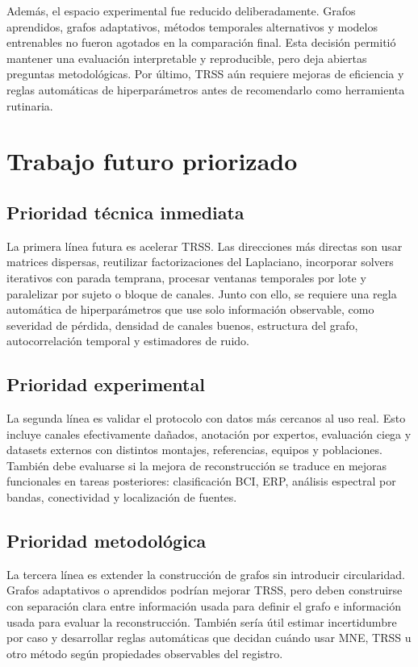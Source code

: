 Además, el espacio experimental fue reducido deliberadamente. Grafos aprendidos, grafos adaptativos, métodos temporales alternativos y modelos entrenables no fueron agotados en la comparación final. Esta decisión permitió mantener una evaluación interpretable y reproducible, pero deja abiertas preguntas metodológicas. Por último, TRSS aún requiere mejoras de eficiencia y reglas automáticas de hiperparámetros antes de recomendarlo como herramienta rutinaria.

\section{Trabajo futuro priorizado}

\subsection*{Prioridad técnica inmediata}

La primera línea futura es acelerar TRSS. Las direcciones más directas son usar matrices dispersas, reutilizar factorizaciones del Laplaciano, incorporar solvers iterativos con parada temprana, procesar ventanas temporales por lote y paralelizar por sujeto o bloque de canales. Junto con ello, se requiere una regla automática de hiperparámetros que use solo información observable, como severidad de pérdida, densidad de canales buenos, estructura del grafo, autocorrelación temporal y estimadores de ruido.

\subsection*{Prioridad experimental}

La segunda línea es validar el protocolo con datos más cercanos al uso real. Esto incluye canales efectivamente dañados, anotación por expertos, evaluación ciega y datasets externos con distintos montajes, referencias, equipos y poblaciones. También debe evaluarse si la mejora de reconstrucción se traduce en mejoras funcionales en tareas posteriores: clasificación BCI, ERP, análisis espectral por bandas, conectividad y localización de fuentes.

\subsection*{Prioridad metodológica}

La tercera línea es extender la construcción de grafos sin introducir circularidad. Grafos adaptativos o aprendidos podrían mejorar TRSS, pero deben construirse con separación clara entre información usada para definir el grafo e información usada para evaluar la reconstrucción. También sería útil estimar incertidumbre por caso y desarrollar reglas automáticas que decidan cuándo usar MNE, TRSS u otro método según propiedades observables del registro.

